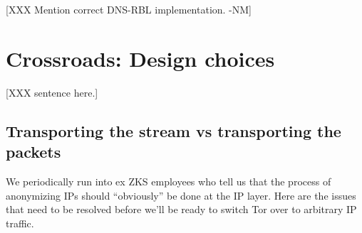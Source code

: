 \documentclass{llncs}
\begin{document}

[XXX Mention correct DNS-RBL implementation. -NM]

\section{Crossroads: Design choices}
\label{sec:crossroads-design}

[XXX sentence here.]

\subsection{Transporting the stream vs transporting the packets}
\label{subsec:stream-vs-packet}
\label{subsec:tcp-vs-ip}

We periodically run into ex ZKS employees who tell us that the process of
anonymizing IPs should ``obviously'' be done at the IP layer. Here are
the issues that need to be resolved before we'll be ready to switch Tor
over to arbitrary IP traffic.
\end{document}
